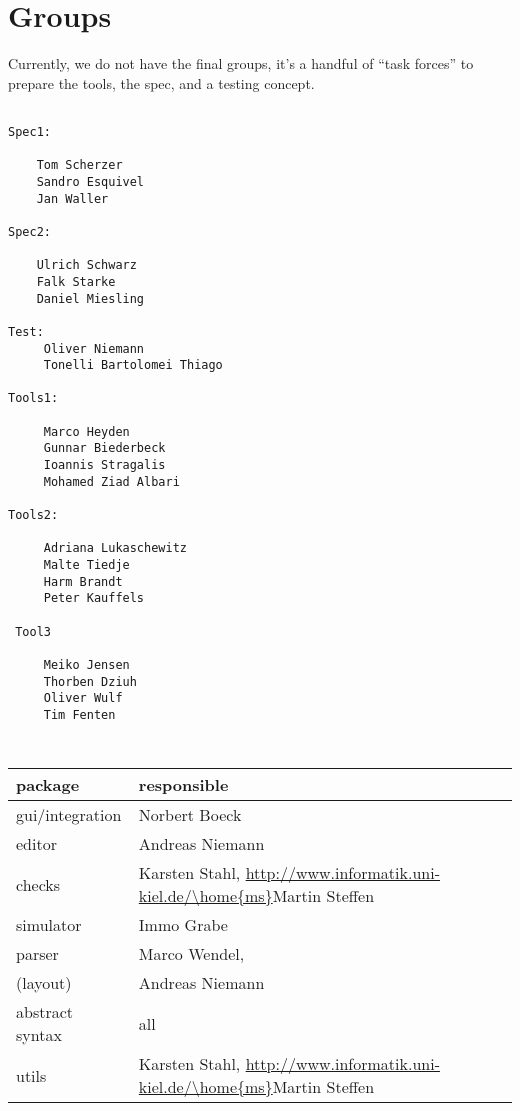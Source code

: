\section*{Groups}
\label{sec:groups}



Currently, we do not have the final groups, it's a handful of ``task
forces'' to prepare the tools, the spec, and a testing concept.

\begin{verbatim}

Spec1:

    Tom Scherzer
    Sandro Esquivel
    Jan Waller 

Spec2:

    Ulrich Schwarz 
    Falk Starke 
    Daniel Miesling

Test:
     Oliver Niemann 
     Tonelli Bartolomei Thiago

Tools1:

     Marco Heyden 
     Gunnar Biederbeck
     Ioannis Stragalis 
     Mohamed Ziad Albari

Tools2:

     Adriana Lukaschewitz
     Malte Tiedje 
     Harm Brandt
     Peter Kauffels 

 Tool3

     Meiko Jensen
     Thorben Dziuh 
     Oliver Wulf 
     Tim Fenten


\end{verbatim}

\iffalse



\begin{table}[htbp]
  \centering
  \begin{tabular}[t]{l@{\quad\quad}l}
     package  &  responsible
     \\\hline
     gui/integration & Norbert Boeck
     \\
     editor & Andreas Niemann
     \\
     checks & 
     Karsten Stahl,
     \url{http://www.informatik.uni-kiel.de/\home{ms}}{Martin Steffen}
     \\
     simulator & Immo Grabe
     \\
     parser & Marco Wendel,
     \\
     (layout) & Andreas Niemann
     \\
     abstract syntax & all
     \\
     utils 
     &
     Karsten Stahl,
     \url{http://www.informatik.uni-kiel.de/\home{ms}}{Martin Steffen}
  \end{tabular}
  \caption{}
  \label{tab:gruppen}
\end{table}




